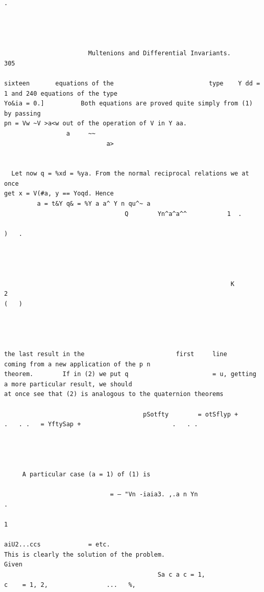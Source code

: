 \documentclass[10pt]{article}
\begin{document}
\clearpage
\begin{verbatim}

                                                                                                                                        .




                       Multenions and Differential Invariants.                                                                                                305

sixteen       equations of the                          type    Y dd = 1 and 240 equations of the type
Yo&ia = 0.]          Both equations are proved quite simply from (1) by passing
pn = Vw ~V >a<w out of the operation of V in Y aa.
                 a     ~~
                            a>


  Let now q = %xd = %ya. From the normal reciprocal relations we at once
get x = V(#a, y == Yoqd. Hence
         a = t&Y q& = %Y a a^ Y n qu^~ a
                                 Q        Yn^a^a^^           1  .
                                                                                              )   .




                                                              K       2                                                                                       (   )




the last result in the                         first     line       coming from a new application of the p n
theorem.        If in (2) we put q                       = u, getting a more particular result, we should
at once see that (2) is analogous to the quaternion theorems

                                      pSotfty        = otSflyp +                .   . .   = YftySap +                         .   . .




     A particular case (a = 1) of (1) is

                             = — "Vn -iaia3. ,.a n Yn                      .
                                                                                          1
                                                                                              aiU2...ccs             = etc.
This is clearly the solution of the problem.                                                          Given
                                          Sa c a c = 1,               c    = 1, 2,                ...   %,


\end{verbatim}
\end{document}
